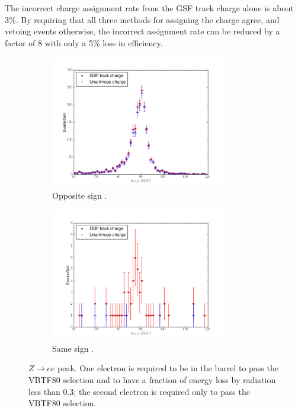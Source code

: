 The incorrect charge assignment rate from the GSF track charge alone is about
\unit{3}{\%}.  By requiring that all three methods for assigning the charge
agree, and vetoing events otherwise, the incorrect assignment rate can be
reduced by a factor of 8 with only a \unit{5}{\%} loss in efficiency.

\begin{figure}[htbp]
  \centering
  \begin{subfigure}{\textwidth}
    \centering
    \includegraphics[width=0.85\textwidth]{zpeak_os}
    \caption{Opposite sign \PZ.}
    \label{fig:zpeak_os}
  \end{subfigure}
  \begin{subfigure}{\textwidth}
    \centering
    \includegraphics[width=0.85\textwidth]{zpeak_ss}
    \caption{Same sign \PZ.}
    \label{fig:zpeak_ss}
  \end{subfigure}
  \caption{ $Z\rightarrow ee$ peak. One electron is required to be in the
barrel to pass the VBTF80 selection and to have a fraction of energy loss by
radiation less than 0.3; the second electron is required only to pass the VBTF80
selection.}\label{fig:zpeak} 
\end{figure}

